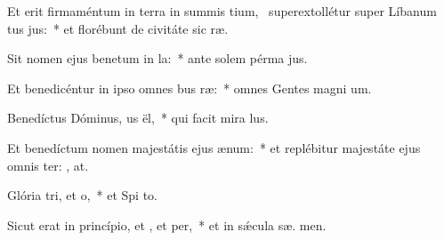 \item Et erit firmaméntum in terra in summis tium,~\pscross{} superextollétur super Líbanum tus jus:~* et florébunt de civitáte sic  ræ.
\item Sit nomen ejus benetum in la:~* ante solem pérma  jus.
\item Et benedicéntur in ipso omnes bus ræ:~* omnes Gentes magni um.
\item Benedíctus Dóminus, us ël,~* qui facit mira lus.
\item Et benedíctum nomen majestátis ejus  ænum:~* et replébitur majestáte ejus omnis ter: , at.
\item Glória tri, et o,~* et Spi to.
\item Sicut erat in princípio, et , et per,~* et in sǽcula sæ. men.
